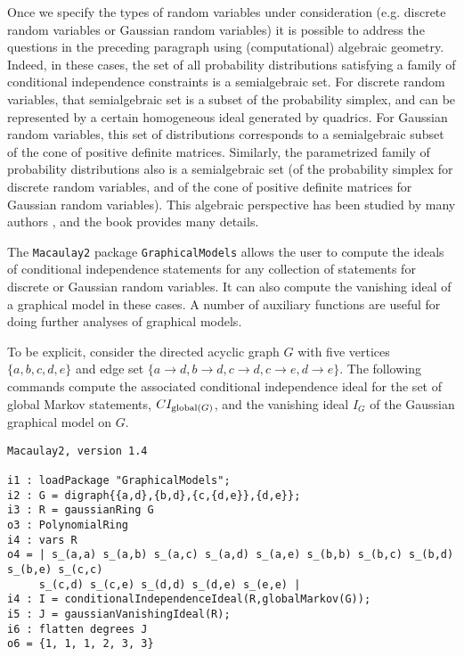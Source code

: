 \documentclass[letterpaper]{article}
\theoremstyle{plain}
\theoremstyle{definition}
\begin{document}
Once we specify the types of random variables under consideration
(e.g. discrete random variables or Gaussian random variables) it
is possible to address the questions in the preceding paragraph
using (computational) algebraic geometry.  Indeed, in these cases,
the set of all probability distributions satisfying a family of 
conditional independence constraints is a semialgebraic set.
For discrete random variables, that semialgebraic set is a subset
of the probability simplex, and can be represented by a certain
homogeneous ideal generated by quadrics.  For Gaussian random variables,
this set of distributions corresponds to a semialgebraic subset
of the cone of positive definite matrices.  Similarly,
the parametrized family of probability distributions also
is a semialgebraic set (of the probability simplex for discrete
random variables, and of the cone of positive definite matrices
for Gaussian random variables).  This algebraic perspective
has been studied by many authors  
\cite{ GSS, GMS, S}, and the book \cite{DSS}
provides many details.

The {\tt Macaulay2} package {\tt GraphicalModels} allows the user to compute
the ideals of conditional independence statements for any collection
of statements for discrete or Gaussian
random variables.  It can also compute the vanishing ideal of 
a graphical model in these cases.  A number of auxiliary functions
are useful for doing further analyses of graphical models.

To be explicit, consider the directed acyclic graph $G$ with  five
vertices $\{a,b,c,d,e\}$ and edge
set $\{a \to d, b \to d, c \to d, c \to e, d \to e\}$.
The following commands compute the associated conditional
independence ideal for the set of global Markov statements,
$CI_{{\rm global}(G)}$, and 
the vanishing ideal $I_{G}$ of the Gaussian graphical model on $G$.


\begin{verbatim}
Macaulay2, version 1.4

i1 : loadPackage "GraphicalModels";
i2 : G = digraph{{a,d},{b,d},{c,{d,e}},{d,e}}; 
i3 : R = gaussianRing G
o3 : PolynomialRing
i4 : vars R
o4 = | s_(a,a) s_(a,b) s_(a,c) s_(a,d) s_(a,e) s_(b,b) s_(b,c) s_(b,d) s_(b,e) s_(c,c) 
     s_(c,d) s_(c,e) s_(d,d) s_(d,e) s_(e,e) |
i4 : I = conditionalIndependenceIdeal(R,globalMarkov(G));
i5 : J = gaussianVanishingIdeal(R);
i6 : flatten degrees J
o6 = {1, 1, 1, 2, 3, 3}
\end{verbatim}
\end{document}
